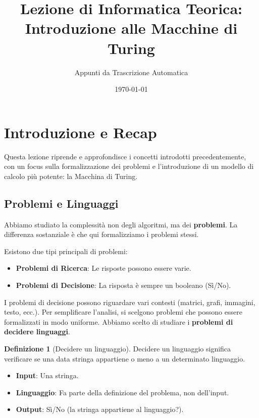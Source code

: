 \documentclass[a4paper]{article}
\title{Lezione di Informatica Teorica: Introduzione alle Macchine di Turing}
\author{Appunti da Trascrizione Automatica}
\date{\today}
\theoremstyle{definition} %
\newtheorem{definition}{Definizione}
\begin{document}
\maketitle
\tableofcontents
\newpage

\section{Introduzione e Recap}

Questa lezione riprende e approfondisce i concetti introdotti precedentemente, con un focus sulla formalizzazione dei problemi e l'introduzione di un modello di calcolo più potente: la Macchina di Turing.

\subsection{Problemi e Linguaggi}
Abbiamo studiato la complessità non degli algoritmi, ma dei \textbf{problemi}. La differenza sostanziale è che qui formalizziamo i problemi stessi.

Esistono due tipi principali di problemi:
\begin{itemize}
    \item \textbf{Problemi di Ricerca}: Le risposte possono essere varie.
    \item \textbf{Problemi di Decisione}: La risposta è sempre un booleano (Sì/No).
\end{itemize}

I problemi di decisione possono riguardare vari contesti (matrici, grafi, immagini, testo, ecc.). Per semplificare l'analisi, si scelgono problemi che possono essere formalizzati in modo uniforme. Abbiamo scelto di studiare i \textbf{problemi di decidere linguaggi}.

\begin{definition}[Decidere un linguaggio]
    Decidere un linguaggio significa verificare se una data stringa appartiene o meno a un determinato linguaggio.
    \begin{itemize}
        \item \textbf{Input}: Una stringa.
        \item \textbf{Linguaggio}: Fa parte della definizione del problema, non dell'input.
        \item \textbf{Output}: Sì/No (la stringa appartiene al linguaggio?).
    \end{itemize}
\end{definition}
\end{document}
